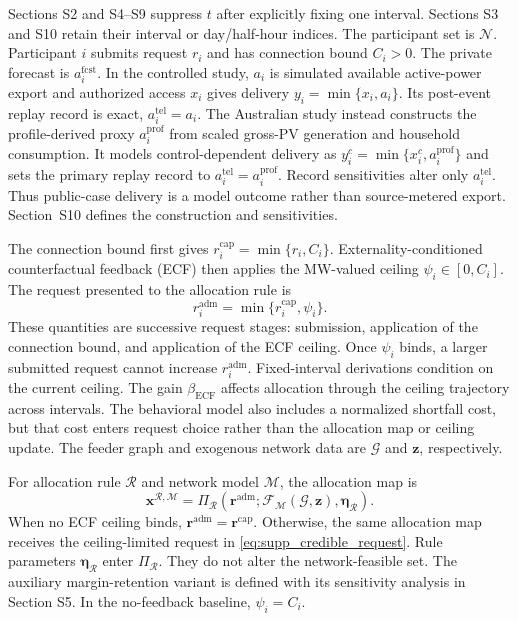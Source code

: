 \documentclass[11pt]{article}
\begin{document}
Sections S2 and S4--S9 suppress $t$ after explicitly fixing one interval.
Sections S3 and S10 retain their interval or day/half-hour indices. The
participant set is $\mathcal N$.
Participant $i$ submits request $r_i$ and has connection bound $C_i>0$.
The private forecast is $a_i^{\mathrm{fcst}}$. In the controlled study,
$a_i$ is simulated available active-power export and authorized access $x_i$
gives delivery $y_i=\min\{x_i,a_i\}$. Its post-event replay record is exact,
$a_i^{\mathrm{tel}}=a_i$. The Australian study instead constructs the
profile-derived proxy $a_i^{\mathrm{prof}}$ from scaled gross-PV generation and
household consumption. It models control-dependent delivery as
$y_i^c=\min\{x_i^c,a_i^{\mathrm{prof}}\}$ and sets the primary replay record to
$a_i^{\mathrm{tel}}=a_i^{\mathrm{prof}}$. Record sensitivities alter only
$a_i^{\mathrm{tel}}$. Thus public-case delivery is a model outcome rather than
source-metered export. Section~S10 defines the construction and sensitivities.

The connection bound first gives
$r_i^{\mathrm{cap}}=\min\{r_i,C_i\}$. Externality-conditioned counterfactual
feedback (ECF) then applies the MW-valued ceiling
$\psi_i\in[0,C_i]$. The request presented to the allocation rule is
\begin{equation}
r_i^{\mathrm{adm}}=\min\{r_i^{\mathrm{cap}},\psi_i\}.
\label{eq:supp_credible_request}
\end{equation}
These quantities are successive request stages: submission, application of the
connection bound, and application of the ECF ceiling. Once $\psi_i$ binds, a
larger submitted request cannot increase $r_i^{\mathrm{adm}}$. Fixed-interval
derivations condition on the current ceiling. The gain
$\beta_{\mathrm{ECF}}$ affects allocation through the ceiling trajectory across
intervals. The behavioral model also includes a normalized shortfall cost, but
that cost enters request choice rather than the allocation map or ceiling
update.
The feeder graph and exogenous network data are $\mathcal G$ and $\mathbf z$,
respectively.

For allocation rule $\mathcal R$ and network model $\mathcal M$, the allocation
map is
\begin{equation}
\mathbf x^{\mathcal R,\mathcal M}
=\Pi_{\mathcal R}\!\left(
\mathbf r^{\mathrm{adm}};
\mathcal F_{\mathcal M}(\mathcal G,\mathbf z),
\boldsymbol\eta_{\mathcal R}\right).
\label{eq:supp_allocation_map}
\end{equation}
When no ECF ceiling binds, $\mathbf r^{\mathrm{adm}}=\mathbf r^{\mathrm{cap}}$.
Otherwise, the same allocation map receives the ceiling-limited request in
\eqref{eq:supp_credible_request}. Rule parameters
$\boldsymbol\eta_{\mathcal R}$ enter $\Pi_{\mathcal R}$. They do not alter the
network-feasible set. The auxiliary margin-retention variant is defined with its sensitivity
analysis in Section S5. In the no-feedback baseline, $\psi_i=C_i$.
\end{document}
